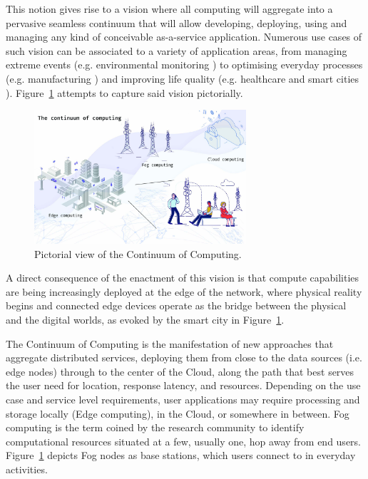 This notion gives rise to a vision where all computing will aggregate into a pervasive seamless continuum that will allow developing, deploying, using and managing any kind of conceivable as-a-service application. 
Numerous use cases of such vision can be associated to a variety of application areas, from managing extreme events (e.g. environmental monitoring \cite{brzoza2016embedded}) to optimising everyday processes (e.g. manufacturing \cite{chen2018edge}) and improving life quality (e.g. healthcare \cite{pace2018edge} and smart cities \cite{he2017multitier}).
Figure~\ref{fig:continuum} attempts to capture said vision pictorially. 
\begin{figure}[ht]
\centering
\includegraphics[width=0.7\textwidth]{figures/continuum}
\caption{Pictorial view of the Continuum of Computing.}
\label{fig:continuum}
\end{figure}

A direct consequence of the enactment of this vision is that compute capabilities are being increasingly deployed at the edge of the network, where physical reality begins and connected edge devices operate as the bridge between the physical and the digital worlds, as evoked by the smart city in Figure~\ref{fig:continuum}.

The Continuum of Computing is the manifestation of new approaches that aggregate distributed services, deploying them from close to the data sources (i.e. edge nodes) through to the center of the Cloud, along the path that best serves the user need for location, response latency, and resources.
Depending on the use case and service level requirements, user applications may require processing and storage locally (Edge computing), in the Cloud, or somewhere in between. Fog computing \cite{fog-computing} is the term coined by the research community to identify computational resources situated at a few, usually one, hop away from end users. 
Figure~\ref{fig:continuum} depicts Fog nodes as base stations, which users connect to in everyday activities.

